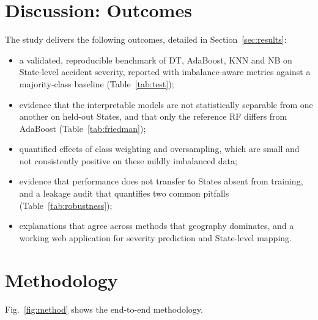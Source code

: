\documentclass[conference]{IEEEtran}
\begin{document}
\section{Discussion: Outcomes}
\label{sec:discussion}

The study delivers the following outcomes, detailed in Section~\ref{sec:results}:
\begin{itemize}
\item a validated, reproducible benchmark of DT, AdaBoost, KNN and NB on State-level accident severity, reported with imbalance-aware metrics against a majority-class baseline (Table~\ref{tab:test});
\item evidence that the interpretable models are not statistically separable from one another on held-out States, and that only the reference RF differs from AdaBoost (Table~\ref{tab:friedman});
\item quantified effects of class weighting and oversampling, which are small and not consistently positive on these mildly imbalanced data;
\item evidence that performance does not transfer to States absent from training, and a leakage audit that quantifies two common pitfalls (Table~\ref{tab:robustness});
\item explanations that agree across methods that geography dominates, and a working web application for severity prediction and State-level mapping.
\end{itemize}

\section{Methodology}
\label{sec:method}

Fig.~\ref{fig:method} shows the end-to-end methodology.
\end{document}
